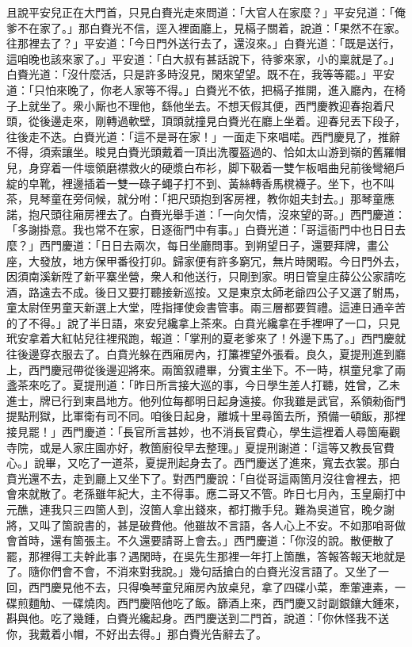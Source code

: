 且說平安兒正在大門首，只見白賚光走來問道：「大官人在家麼？」平安兒道：「俺爹不在家了。」那白賚光不信，逕入裡面廳上，{}見槅子關着，說道：「果然不在家。往那裡去了？」平安道：「今日門外送行去了，還沒來。」白賚光道：「既是送行，這咱晚也該來家了。」平安道：「白大叔有甚話說下，待爹來家，小的稟就是了。」白賚光道：「沒什麼活，只是許多時沒見，閑來望望。既不在，我等等罷。」{}平安道：「只怕來晚了，你老人家等不得。」白賚光不依，把槅子推開，進入廳內，在椅子上就坐了。衆小厮也不理他，繇他坐去。不想天假其便，西門慶教迎春抱着尺頭，從後邊走來，剛轉過軟壁，頂頭就撞見白賚光在廳上坐着。迎春兒丟下段子，往後走不迭。白賚光道：「這不是哥在家！」一面走下來唱喏。西門慶見了，推辭不得，須索讓坐。睃見白賚光頭戴着一頂出洗覆盔過的、恰如太山游到嶺的舊羅帽兒，{}身穿着一件壞領磨襟救火的硬漿白布衫，脚下靸着一雙乍板唱曲兒前後彎絕戶綻的皁靴，{}裡邊插着一雙一碌子蠅子打不到、黃絲轉香馬櫈襪子。坐下，也不叫茶，見琴童在旁伺候，就分咐：「把尺頭抱到客房裡，教你姐夫封去。」那琴童應諾，抱尺頭往廂房裡去了。白賚光舉手道：「一向欠情，沒來望的哥。」西門慶道：「多謝掛意。我也常不在家，日逐衙門中有事。」白賚光道：「哥這衙門中也日日去麼？」西門慶道：「日日去兩次，每日坐廳問事。到朔望日子，還要拜牌，畫公座，大發放，地方保甲番役打卯。歸家便有許多窮冗，無片時閑暇。今日門外去，因須南溪新陞了新平寨坐營，衆人和他送行，只剛到家。明日管皇庄薛公公家請吃酒，路遠去不成。後日又要打聽接新巡按。又是東京太師老爺四公子又選了駙馬，童太尉侄男童天新選上大堂，陞指揮使僉書管事。兩三層都要賀禮。這連日通辛苦的了不得。」說了半日語，來安兒纔拿上茶來。白賁光纔拿在手裡呷了一口，只見玳安拿着大紅帖兒往裡飛跑，報道：「掌刑的夏老爹來了！外邊下馬了。」西門慶就往後邊穿衣服去了。白賁光躲在西廂房內，打簾裡望外張看。良久，夏提刑進到廳上，西門慶冠帶從後邊迎將來。兩箇叙禮畢，分賓主坐下。不一時，棋童兒拿了兩盞茶來吃了。夏提刑道：「昨日所言接大巡的事，今日學生差人打聽，姓曾，乙未進士，牌已行到東昌地方。他列位每都明日起身遠接。你我雖是武官，系領勑衙門提點刑獄，比軍衛有司不同。咱後日起身，離城十里尋箇去所，預備一頓飯，那裡接見罷！」{}西門慶道：「長官所言甚妙，也不消長官費心，學生這裡着人尋箇庵觀寺院，或是人家庄園亦好，教箇廚役早去整理。」夏提刑謝道：「這等又教長官費心。」說畢，又吃了一道茶，夏提刑起身去了。西門慶送了進來，寬去衣裳。那白賁光還不去，走到廳上又坐下了。對西門慶說：「自從哥這兩箇月沒往會裡去，把會來就散了。老孫雖年紀大，主不得事。應二哥又不管。昨日七月內，玉皇廟打中元醮，連我只三四箇人到，沒箇人拿出錢來，都打撒手兒。{}難為吳道官，晚夕謝將，又叫了箇說書的，甚是破費他。他雖故不言語，各人心上不安。不如那咱哥做會首時，還有箇張主。不久還要請哥上會去。」西門慶道：「你沒的說。散便散了罷，那裡得工夫幹此事？遇閑時，在吳先生那裡一年打上箇醮，答報答報天地就是了。隨你們會不會，不消來對我說。」幾句話搶白的白賚光沒言語了。又坐了一回，西門慶見他不去，只得喚琴童兒廂房內放桌兒，拿了四碟小菜，牽葷連素，一碟煎麵觔、一碟燒肉。{}西門慶陪他吃了飯。篩酒上來，西門慶又討副銀鑲大鍾來，斟與他。吃了幾鍾，白賚光纔起身。西門慶送到二門首，說道：「你休怪我不送你，我戴着小帽，不好出去得。」那白賚光告辭去了。

